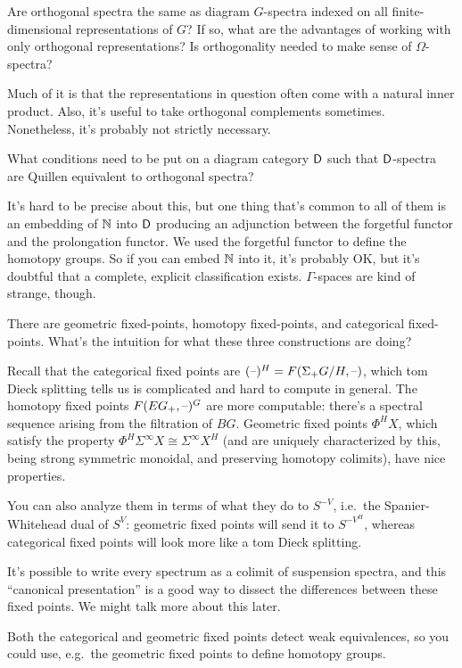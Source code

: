 \begin{ques}
Are orthogonal spectra the same as diagram $G$-spectra indexed on all finite-dimensional representations of $G$? If
so, what are the advantages of working with only orthogonal representations? Is orthogonality needed to make sense
of $\Omega$-spectra?
\end{ques}
Much of it is that the representations in question often come with a natural inner product. Also, it's useful to
take orthogonal complements sometimes. Nonetheless, it's probably not strictly necessary.
\begin{ques}
What conditions need to be put on a diagram category $\mathsf D$ such that $\mathsf D$-spectra are Quillen equivalent to
orthogonal spectra?
\end{ques}
It's hard to be precise about this, but one thing that's common to all of them is an embedding of $\mathbb N$ into $\mathsf D$
producing an adjunction between the forgetful functor and the prolongation functor. We used the forgetful functor
to define the homotopy groups. So if you can embed $\mathbb N$ into it, it's probably OK, but it's doubtful that a
complete, explicit classification exists. $\Gamma$-spaces are kind of strange, though.
\begin{ques}
There are geometric fixed-points, homotopy fixed-points, and categorical fixed-points. What's the intuition for
what these three constructions are doing?
\end{ques}
Recall that the categorical fixed points are $(\text{--})^H = F(\Sigma_+ G/H,\text{--})$, which tom Dieck splitting tells us is
complicated and hard to compute in general. The homotopy fixed points $F(EG_+,\text{--})^G$ are more computable: there's
a spectral sequence arising from the filtration of $BG$. Geometric fixed points $\Phi^HX$, which satisfy the
property $\Phi^H\Sigma^\infty X \cong \Sigma^\infty X^H$ (and are uniquely characterized by this, being strong
symmetric monoidal, and preserving homotopy colimits), have nice properties.

You can also analyze them in terms of what they do to $S^{-V}$, i.e.\ the Spanier-Whitehead dual of $S^V$:
geometric fixed points will send it to $S^{-V^H}$, whereas categorical fixed points will look more like a tom Dieck
splitting.

It's possible to write every spectrum as a colimit of suspension spectra, and this ``canonical presentation'' is a
good way to dissect the differences between these fixed points. We might talk more about this later.

Both the categorical and geometric fixed points detect weak equivalences, so you could use, e.g.\ the geometric
fixed points to define homotopy groups.

